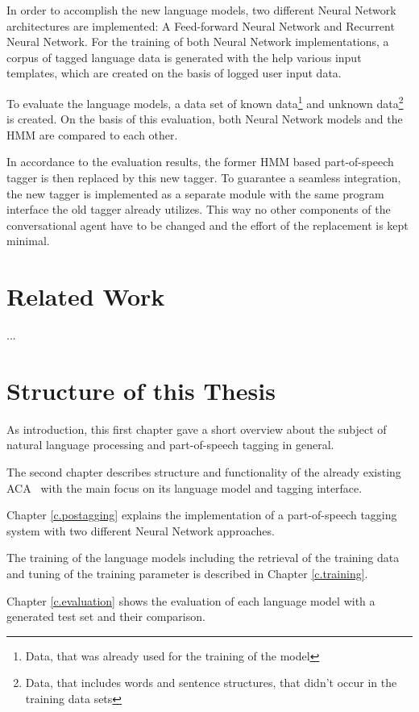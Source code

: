 In order to accomplish the new language models, two different Neural Network architectures are implemented: A Feed-forward Neural Network and Recurrent Neural Network. For the training of both Neural Network implementations, a corpus of tagged language data is generated with the help various input templates, which are created on the basis of logged user input data.

To evaluate the language models, a data set of known data\footnote{Data, that was already used for the training of the model} and unknown data\footnote{Data, that includes words and sentence structures, that didn't occur in the training data sets} is created. On the basis of this evaluation, both Neural Network models and the HMM are compared to each other.

In accordance to the evaluation results, the former HMM based part-of-speech tagger is then replaced by this new tagger. To guarantee a seamless integration, the new tagger is implemented as a separate module with the same program interface the old tagger already utilizes. This way no other components of the conversational agent have to be changed and the effort of the replacement is kept minimal.



\section{Related Work}\label{c.introduction.related}
...

\section{Structure of this Thesis}\label{c.introduction.structure}
As introduction, this first chapter gave a short overview about the subject of natural language processing and part-of-speech tagging in general.

The second chapter describes structure and functionality of the already existing ACA \Alex\ with the main focus on its language model and tagging interface.

Chapter \ref{c.postagging} explains the implementation of a part-of-speech tagging system with two different Neural Network approaches.

The training of the language models including the retrieval of the training data and tuning of the training parameter is described in Chapter \ref{c.training}.

Chapter \ref{c.evaluation} shows the evaluation of each language model with a generated test set and their comparison.

